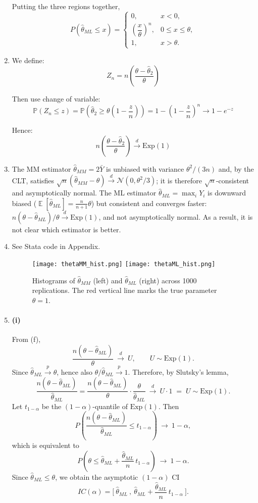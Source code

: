 \documentclass[12pt]{article}
\DeclareMathOperator{\E}{\mathbb{E}}
\begin{document}
\begin{flushleft}
\begin{enumerate}[label=(\alph*)]
Putting the three regions together,
\[
P(\hat\theta_{ML} \le x)
=
\begin{cases}
0, & x<0,\\[6pt]
\left(\dfrac{x}{\theta}\right)^n, & 0\le x \le \theta,\\[10pt]
1, & x>\theta.
\end{cases}
\]
\item

We define:
\[
Z_n = n \left( \frac{\theta - \hat{\theta}_2}{\theta} \right)
\]

Then use change of variable:
\[
\mathbb{P}(Z_n \leq z) = \mathbb{P}\left( \hat{\theta}_2 \geq \theta \left(1 - \frac{z}{n} \right) \right) = 1 - \left(1 - \frac{z}{n} \right)^n \to 1 - e^{-z}
\]

Hence:
\[
n \left( \frac{\theta - \hat{\theta}_2}{\theta} \right) \xrightarrow{d} \text{Exp}(1)
\]

\item 
The MM estimator $\hat\theta_{MM}=2\bar Y$ is unbiased with variance $\theta^2/(3n)$ and, by the CLT, satisfies $\sqrt{n}(\hat\theta_{MM}-\theta)\xrightarrow{d}\mathcal N(0,\theta^2/3)$; it is therefore $\sqrt{n}$-consistent and asymptotically normal. The ML estimator $\hat\theta_{ML}=\max_i Y_i$ is downward biased ($\E[\hat\theta_{ML}]=\tfrac{n}{n+1}\theta$) but consistent and converges faster: $n(\theta-\hat\theta_{ML})/\theta \xrightarrow{d}\mathrm{Exp}(1)$, and not asymptotically normal. As a result, it is not clear which estimator is better.
\item See Stata code in Appendix.
\begin{figure}[h!]
    \centering
    \texttt{[image: thetaMM\_hist.png]}
    \texttt{[image: thetaML\_hist.png]}
    \caption{Histograms of $\hat\theta_{MM}$ (left) and $\hat\theta_{ML}$ (right) across 1000 replications. 
    The red vertical line marks the true parameter $\theta=1$.}
    \label{fig:mmml}
\end{figure}

\item
\paragraph{(i)}
From (f),
\[
\frac{n(\theta-\hat\theta_{ML})}{\theta}\ \xrightarrow{d}\ U,\qquad U\sim\mathrm{Exp}(1).
\]
Since $\hat\theta_{ML} \xrightarrow{p} \theta$, hence also $\theta/\hat\theta_{ML}\xrightarrow{p}1$.
Therefore, by Slutsky’s lemma,
\[
\frac{n(\theta-\hat\theta_{ML})}{\hat\theta_{ML}}
=\frac{n(\theta-\hat\theta_{ML})}{\theta}\cdot\frac{\theta}{\hat\theta_{ML}}
\ \xrightarrow{d}\ U\cdot 1 \;=\; U\sim\mathrm{Exp}(1).
\]
Let $t_{1-\alpha}$ be the $(1-\alpha)$-quantile of $\mathrm{Exp}(1)$. Then
\[
P\!\left(\frac{n(\theta-\hat\theta_{ML})}{\hat\theta_{ML}}\le t_{1-\alpha}\right)\ \to\ 1-\alpha,
\]
which is equivalent to
\[
P\!\left(\theta \le \hat\theta_{ML}+\frac{\hat\theta_{ML}}{n}\,t_{1-\alpha}\right)\ \to\ 1-\alpha.
\]
Since $\hat\theta_{ML}\le \theta$, we obtain the asymptotic $(1-\alpha)$ CI
\[
IC(\alpha)=\bigg[\ \hat\theta_{ML}\ ,\ \hat\theta_{ML}+\frac{\hat\theta_{ML}}{n}\,t_{1-\alpha}\ \bigg].
\]


\end{enumerate}
\end{flushleft}
\end{document}
